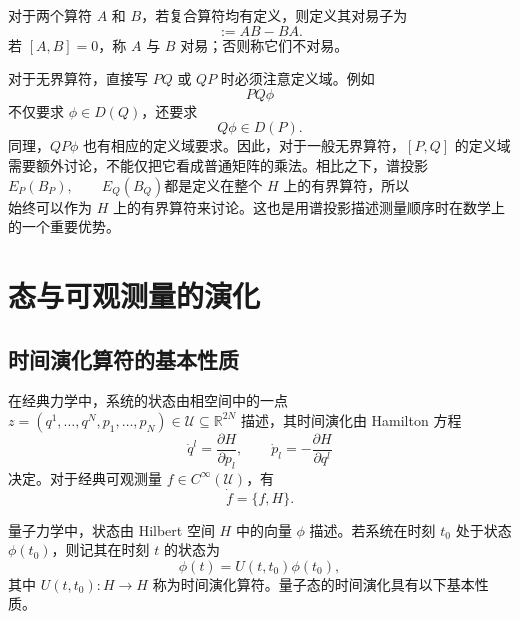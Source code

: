 \documentclass[UTF8,a4paper,11pt,openany]{ctexbook}
\begin{document}
\begin{definition}[对易子]
对于两个算符 $A$ 和 $B$，若复合算符均有定义，则定义其对易子为
\begin{equation}
    [A,B]:=AB-BA.
\end{equation}
若 $[A,B]=0$，称 $A$ 与 $B$ 对易；否则称它们不对易。
\end{definition}

对于无界算符，直接写 $PQ$ 或 $QP$ 时必须注意定义域。例如
\[
PQ\phi
\]
不仅要求 $\phi\in D(Q)$，还要求
\[
Q\phi\in D(P).
\]
同理，$QP\phi$ 也有相应的定义域要求。因此，对于一般无界算符，$[P,Q]$ 的定义域需要额外讨论，不能仅把它看成普通矩阵的乘法。相比之下，谱投影$E_P(B_P),\qquad E_Q(B_Q)$都是定义在整个 $H$ 上的有界算符，所以
\begin{equation}
    [E_Q(B_Q),E_P(B_P)]
\end{equation}
始终可以作为 $H$ 上的有界算符来讨论。这也是用谱投影描述测量顺序时在数学上的一个重要优势。


\newpage
\chapter{态与可观测量的演化}

\section{时间演化算符的基本性质}

在经典力学中，系统的状态由相空间中的一点
$z=(q^1,\ldots,q^N,p_1,\ldots,p_N)\in\mathcal U\subseteq\mathbb R^{2N}$
描述，其时间演化由 Hamilton 方程
\begin{equation}
    \dot q^l=\frac{\partial H}{\partial p_l},
    \qquad
    \dot p_l=-\frac{\partial H}{\partial q^l}
\end{equation}
决定。对于经典可观测量 $f\in C^\infty(\mathcal U)$，有
\begin{equation}
    \dot f=\{f,H\}.
\end{equation}

量子力学中，状态由 Hilbert 空间 $H$ 中的向量 $\phi$ 描述。若系统在时刻 $t_0$ 处于状态 $\phi(t_0)$，则记其在时刻 $t$ 的状态为
\begin{equation}
    \phi(t)=U(t,t_0)\phi(t_0),
\end{equation}
其中 $U(t,t_0):H\to H$ 称为时间演化算符。量子态的时间演化具有以下基本性质。
\end{document}

